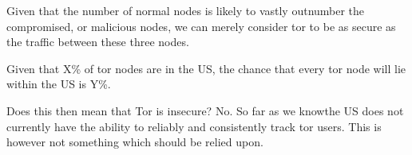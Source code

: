 Given that the number of normal nodes is likely to vastly outnumber the
compromised, or malicious nodes, we can merely consider tor to be as secure as
the traffic between these three nodes.

Given that X\% of tor nodes are in the US, the chance that every tor
node will lie within the US is Y\%.

Does this then mean that Tor is insecure? No. So far as we knowthe US does not currently have the ability to reliably and
consistently track tor users. This is however not something which should be
relied upon.
